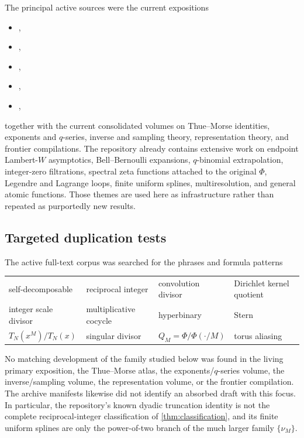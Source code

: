 \documentclass[11pt,oneside]{article}
\theoremstyle{definition}
\theoremstyle{remark}
\numberwithin{equation}{section}
\newcommand{\1}{\mathbf 1}
\begin{document}
The principal active sources were the current expositions~\cite{ProveItPrimary,ProveItFrontiers}
\begin{itemize}
\item {},
\item {},
\item {},
\item {},
\item {},
\end{itemize}
together with the current consolidated volumes on Thue--Morse identities, exponents and
$q$-series, inverse and sampling theory, representation theory, and frontier compilations.
The repository already contains extensive work on endpoint Lambert-$W$ asymptotics,
Bell--Bernoulli expansions, $q$-binomial extrapolation, integer-zero filtrations, spectral
zeta functions attached to the original $\Phi$, Legendre and Lagrange loops, finite uniform
splines, multiresolution, and general atomic functions.  Those themes are used here as
infrastructure rather than repeated as purportedly new results.

\subsection{Targeted duplication tests}

The active full-text corpus was searched for the phrases and formula patterns
\begin{center}
\begin{tabular}{llll}
\toprule
self-decomposable & reciprocal integer & convolution divisor & Dirichlet kernel quotient\\
integer scale divisor & multiplicative cocycle & hyperbinary & Stern\\
$T_N(x^M)/T_N(x)$ & singular divisor & $Q_M=\Phi/\Phi(\cdot/M)$ & torus aliasing\\
\bottomrule
\end{tabular}
\end{center}
No matching development of the family studied below was found in the living primary
exposition, the Thue--Morse atlas, the exponents/$q$-series volume, the inverse/sampling
volume, the representation volume, or the frontier compilation.  The archive manifests
likewise did not identify an absorbed draft with this focus.  In particular, the repository's
known dyadic truncation identity is not the complete reciprocal-integer classification of
\cref{thm:classification}, and its finite uniform splines are only the power-of-two branch of
the much larger family $\{\nu_M\}$.
\end{document}
